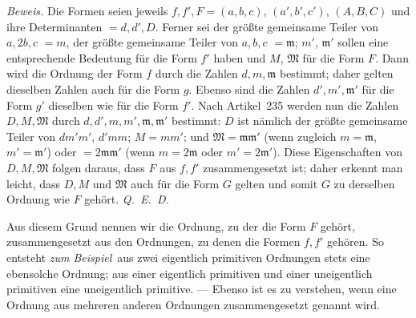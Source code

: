 \textit{Beweis.} Die Formen seien jeweils $f,f',F=(a,b,c)$, $(a',b',c')$, $(A,B,C)$ und ihre Determinanten $=d,d',D$. Ferner sei der größte gemeinsame Teiler von $a,2b,c$ $=m$, der größte gemeinsame Teiler von $a,b,c$ $=\mathfrak{m}$; $m'$, $\mathfrak{m}'$ sollen eine entsprechende Bedeutung für die Form $f'$ haben und $M$, $\mathfrak{M}$ für die Form $F$. Dann wird die Ordnung der Form $f$ durch die Zahlen $d,m,\mathfrak{m}$ bestimmt; daher gelten dieselben Zahlen auch für die Form $g$. Ebenso sind die Zahlen $d',m',\mathfrak{m}'$ für die Form $g'$ dieselben wie für die Form $f'$. Nach Artikel~235 werden nun die Zahlen $D,M,\mathfrak{M}$ durch $d,d',m,m',\mathfrak{m},\mathfrak{m}'$ bestimmt: $D$ ist nämlich der größte gemeinsame Teiler von $dm'm'$, $d'mm$; $M=mm'$; und $\mathfrak{M}=\mathfrak{m}\mathfrak{m}'$ (wenn zugleich $m=\mathfrak{m}$, $m'=\mathfrak{m}'$) oder $=2\mathfrak{m}\mathfrak{m}'$ (wenn $m=2\mathfrak{m}$ oder $m'=2\mathfrak{m}'$). Diese Eigenschaften von $D,M,\mathfrak{M}$ folgen daraus, dass $F$ aus $f,f'$ zusammengesetzt ist; daher erkennt man leicht, dass $D,M$ und $\mathfrak{M}$ auch für die Form $G$ gelten und somit $G$ zu derselben Ordnung wie $F$ gehört. \textit{Q.~E.~D.}

Aus diesem Grund nennen wir die Ordnung, zu der die Form $F$ gehört, zusammengesetzt aus den Ordnungen, zu denen die Formen $f,f'$ gehören. So entsteht \textit{zum Beispiel}\ aus zwei eigentlich primitiven Ordnungen stets eine ebensolche Ordnung; aus einer eigentlich primitiven und einer uneigentlich primitiven eine uneigentlich primitive. --- Ebenso ist es zu verstehen, wenn eine Ordnung aus mehreren anderen Ordnungen zusammengesetzt genannt wird.

